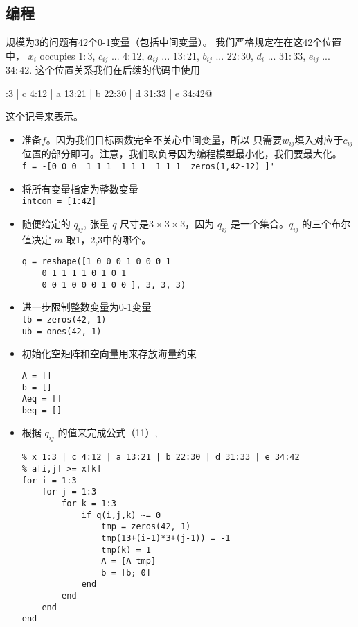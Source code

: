 \documentclass[onecolumn,times]{article}
\begin{document}
\begin{CJK}{UTF8}{gkai}
\subsection{编程}

规模为3的问题有42个0-1变量（包括中间变量）。
我们严格规定在在这42个位置中，
$x_i$ occupies $1:3$,
$c_{ij}$ ... $4:12$,
$a_{ij}$ ... $13:21$,
$b_{ij}$ ... $22:30$,
$d_{i}$ ... $31:33$,
$e_{ij}$ ... $34:42$.
这个位置关系我们在后续的代码中使用
\begin{center}
:3 | c 4:12 | a 13:21 | b 22:30 | d 31:33 | e 34:42@
\end{center}
这个记号来表示。

\begin{itemize}
\item 准备$f$。因为我们目标函数完全不关心中间变量，所以
		只需要$w_{ij}$填入对应于$c_{ij}$位置的部分即可。注意，我们取负号因为编程模型最小化，我们要最大化。\\
\verb|f = -[0 0 0  1 1 1  1 1 1  1 1 1  zeros(1,42-12) ]'|
\item 将所有变量指定为整数变量\\
\verb|intcon = [1:42]|
\item 随便给定的 $q_{ij}$, 张量 $q$ 尺寸是$3\times 3\times 3$，因为
	$q_{ij}$ 是一个集合。$q_{ij}$ 的三个布尔值决定 $m$ 取1，2,3中的哪个。
\begin{verbatim}
q = reshape([1 0 0 0 1 0 0 0 1
	0 1 1 1 1 0 1 0 1
	0 0 1 0 0 0 1 0 0 ], 3, 3, 3)
\end{verbatim}
\item 进一步限制整数变量为0-1变量\\
\verb|lb = zeros(42, 1)|\\
\verb|ub = ones(42, 1)|

\item 初始化空矩阵和空向量用来存放海量约束\\
\begin{verbatim}
A = []
b = []
Aeq = []
beq = []
\end{verbatim}

\item 根据 $q_{ij}$ 的值来完成公式（11）,
\begin{Verbatim}
% x 1:3 | c 4:12 | a 13:21 | b 22:30 | d 31:33 | e 34:42
% a[i,j] >= x[k]
for i = 1:3
	for j = 1:3
		for k = 1:3
			if q(i,j,k) ~= 0
				tmp = zeros(42, 1)
				tmp(13+(i-1)*3+(j-1)) = -1
				tmp(k) = 1
				A = [A tmp]
				b = [b; 0]
			end
		end
	end
end
\end{Verbatim}


\end{itemize}
\end{CJK}
\end{document}
